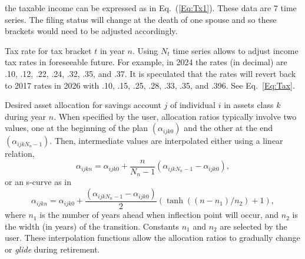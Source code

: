 \documentclass{article}[fleqn,12pt]
\begin{document}
\begin{description}[leftmargin=4em,style=multiline]
	the taxable income can be expressed as in Eq.~(\ref{Eq:Tx1}). These data are 7 time series.
	The filing status will change at the death of one spouse and so these brackets would need
	to be adjusted accordingly.
\item [$\theta_{t n}$]
	Tax rate for tax bracket $t$ in year $n$. Using $N_t$ time series allows to adjust income
	tax rates in foreseeable future.
	For example, in 2024 the rates (in decimal) are .10, .12, .22, .24, .32, .35, and .37.
	It is speculated that the rates will revert back to 2017 rates in 2026 with
	.10, .15, .25, .28, .33, .35, and .396. See Eq.~\ref{Eq:Tax}.
\item [$\alpha_{ijkn}$]
	Desired asset allocation for savings account $j$ of individual $i$ in assets class $k$ during year $n$.
	When specified by the user, allocation ratios typically involve two values, one at the
	beginning of the plan $(\alpha_{ijk0})$ and the other at the end
	$(\alpha_{ijkN_n-1})$. Then, intermediate values are interpolated either using
	a linear relation,
\begin{equation}
	\alpha_{ijkn} = \alpha_{ijk0} + \frac{n}{N_n - 1} (\alpha_{ijkN_n-1} - \alpha_{ijk0}),
\end{equation}
or an s-curve as in
\begin{equation}
	\alpha_{ijkn} = \alpha_{ijk0} + \frac{(\alpha_{ijkN_n-1} - \alpha_{ijk0})}{2}
	(\tanh((n-n_1)/n_2) + 1),
\end{equation}
	where $n_1$ is the number of years ahead when inflection point will occur, and $n_2$ is the
	width (in years) of the transition. Constants $n_1$ and $n_2$ are selected by the user.
	These interpolation functions allow the allocation ratios to gradually change
	or {\em glide} during retirement.


\end{description}
\end{document}
